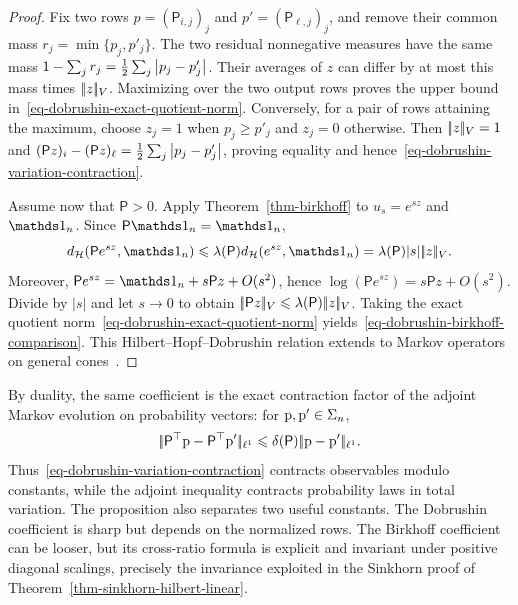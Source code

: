 \begin{proof}
	Fix two rows $p=(\mathsf P_{i,j})_j$ and $p'=(\mathsf P_{\ell,j})_j$, and remove their common mass $r_j=\min\{p_j,p'_j\}$. The two residual nonnegative measures have the same mass
	\(1-\sum_jr_j = \frac12\sum_j\left\lvert p_j-p'_j\right\rvert\).
	Their averages of $z$ can differ by at most this mass times $|\!| z |\!|_V$. Maximizing over the two output rows proves the upper bound in~\eqref{eq-dobrushin-exact-quotient-norm}. Conversely, for a pair of rows attaining the maximum, choose $z_j=1$ when $p_j\geq p'_j$ and $z_j=0$ otherwise. Then $|\!| z |\!|_V=1$ and $(\mathsf Pz)_i-(\mathsf Pz)_\ell=\frac12\sum_j\left\lvert p_j-p'_j\right\rvert$, proving equality and hence~\eqref{eq-dobrushin-variation-contraction}.

	Assume now that $\mathsf P>0$. Apply Theorem~\ref{thm-birkhoff} to $u_s=e^{sz}$ and $\ones_n$. Since $\mathsf P\ones_n=\ones_n$,
	\[
		\Hilbert(\mathsf P e^{sz},\ones_n)
		\leq
		\la(\mathsf P)\Hilbert(e^{sz},\ones_n)
		=
		\la(\mathsf P)|s|\norm{z}_V.
	\]
	Moreover, $\mathsf P e^{sz}=\ones_n+s\mathsf Pz+O(s^2)$, hence $\log(\mathsf P e^{sz})=s\mathsf Pz+O(s^2)$. Divide by $|s|$ and let $s\to0$ to obtain $|\!| \mathsf Pz |\!|_V\leqslant\lambda(\mathsf P)|\!| z |\!|_V$. Taking the exact quotient norm~\eqref{eq-dobrushin-exact-quotient-norm} yields~\eqref{eq-dobrushin-birkhoff-comparison}. This Hilbert--Hopf--Dobrushin relation extends to Markov operators on general cones~\cite{GaubertQu2015Dobrushin}.
\end{proof}

By duality, the same coefficient is the exact contraction factor of the adjoint Markov evolution on probability vectors: for $\mathrm{p},\mathrm{p}'\in\Sigma_n$,
\[
	|\!| \mathsf P^\top\mathrm{p}-\mathsf P^\top\mathrm{p}' |\!|_{\ell^1}
	\leqslant
	\delta(\mathsf P)|\!| \mathrm{p}-\mathrm{p}' |\!|_{\ell^1}.
\]
Thus~\eqref{eq-dobrushin-variation-contraction} contracts observables modulo constants, while the adjoint inequality contracts probability laws in total variation. The proposition also separates two useful constants. The Dobrushin coefficient is sharp but depends on the normalized rows. The Birkhoff coefficient can be looser, but its cross-ratio formula is explicit and invariant under positive diagonal scalings, precisely the invariance exploited in the Sinkhorn proof of Theorem~\ref{thm-sinkhorn-hilbert-linear}.

